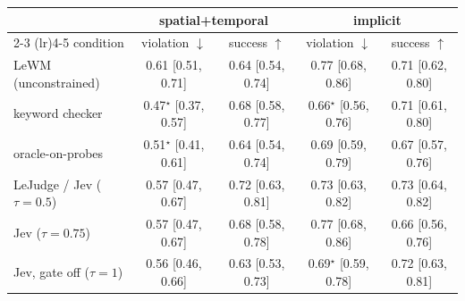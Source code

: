 \begin{tabular}{lcccc}
\toprule
& \multicolumn{2}{c}{spatial+temporal} & \multicolumn{2}{c}{implicit} \\
\cmidrule(lr){2-3} \cmidrule(lr){4-5}
condition & violation $\downarrow$ & success $\uparrow$ & violation $\downarrow$ & success $\uparrow$ \\
\midrule
LeWM (unconstrained) & 0.61 {\scriptsize[0.51, 0.71]} & 0.64 {\scriptsize[0.54, 0.74]} & 0.77 {\scriptsize[0.68, 0.86]} & 0.71 {\scriptsize[0.62, 0.80]} \\
keyword checker & 0.47$^{\star}$ {\scriptsize[0.37, 0.57]} & 0.68 {\scriptsize[0.58, 0.77]} & 0.66$^{\star}$ {\scriptsize[0.56, 0.76]} & 0.71 {\scriptsize[0.61, 0.80]} \\
oracle-on-probes & 0.51$^{\star}$ {\scriptsize[0.41, 0.61]} & 0.64 {\scriptsize[0.54, 0.74]} & 0.69 {\scriptsize[0.59, 0.79]} & 0.67 {\scriptsize[0.57, 0.76]} \\
LeJudge / Jev ($\tau{=}0.5$) & 0.57 {\scriptsize[0.47, 0.67]} & 0.72 {\scriptsize[0.63, 0.81]} & 0.73 {\scriptsize[0.63, 0.82]} & 0.73 {\scriptsize[0.64, 0.82]} \\
Jev ($\tau{=}0.75$) & 0.57 {\scriptsize[0.47, 0.67]} & 0.68 {\scriptsize[0.58, 0.78]} & 0.77 {\scriptsize[0.68, 0.86]} & 0.66 {\scriptsize[0.56, 0.76]} \\
Jev, gate off ($\tau{=}1$) & 0.56 {\scriptsize[0.46, 0.66]} & 0.63 {\scriptsize[0.53, 0.73]} & 0.69$^{\star}$ {\scriptsize[0.59, 0.78]} & 0.72 {\scriptsize[0.63, 0.81]} \\
\bottomrule
\end{tabular}